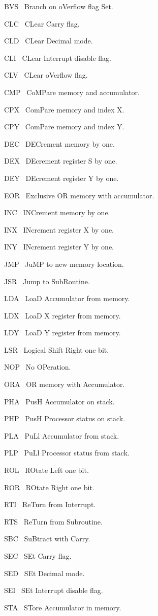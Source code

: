 \documentclass[12pt,twoside]{book}
\begin{document}
BVS \ Branch on oVerflow flag Set.

CLC \ CLear Carry flag.

CLD \ CLear Decimal mode.

CLI \ CLear Interrupt disable flag.

CLV \ CLear oVerflow flag.

CMP \ CoMPare memory and accumulator.

CPX \ ComPare memory and index X.

CPY \ ComPare memory and index Y.

DEC \ DECrement memory by one.

DEX \ DEcrement register S by one.

DEY \ DEcrement register Y by one.

EOR \ Exclusive OR memory with accumulator.

INC \ INCrement memory by one.

INX \ INcrement register X by one.

INY \ INcrement register Y by one.

JMP \ JuMP to new memory location.

JSR \ Jump to SubRoutine.

LDA \ LoaD Accumulator from memory.

LDX \ LoaD X register from memory.

LDY \ LoaD Y register from memory.

LSR \ Logical Shift Right one bit.

NOP \ No OPeration.

ORA \ OR memory with Accumulator.

PHA \ PusH Accumulator on stack.

PHP \ PusH Processor status on stack.

PLA \ PuLl Accumulator from stack.

PLP \ PuLl Processor status from stack.

ROL \ ROtate Left one bit.

ROR \ ROtate Right one bit.

RTI \ ReTurn from Interrupt.

RTS \ ReTurn from Subroutine.

SBC \ SuBtract with Carry.

SEC \ SEt Carry flag.

SED \ SEt Decimal mode.

SEI \ SEt Interrupt disable flag.

STA \ STore Accumulator in memory.
\end{document}
